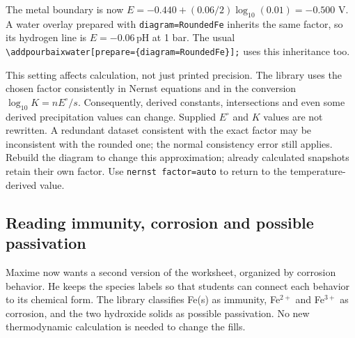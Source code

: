 \documentclass[a4paper,11pt]{ltxdoc}
\begin{document}
\begin{codeexample}[width=0pt]
\RoundedHandle
{}
\end{codeexample}

The metal boundary is now $E=-0.440+(0.06/2)\log_{10}(0.01)=-0.500$ V.
A water overlay prepared with \texttt{diagram=RoundedFe} inherits the same
factor, so its hydrogen line is $E=-0.06\,\mathrm{pH}$ at 1 bar. The usual
\verb|\addpourbaixwater[prepare={diagram=RoundedFe}];| uses this inheritance too.

This setting affects calculation, not just printed precision. The library uses
the chosen factor consistently in Nernst equations and in the conversion
$\log_{10}K=nE^\circ/s$. Consequently, derived constants, intersections and even
some derived precipitation values can change. Supplied $E^\circ$ and $K$ values
are not rewritten. A redundant dataset consistent with the exact factor may
be inconsistent with the rounded one; the normal consistency error still
applies. Rebuild the diagram to change this approximation; already calculated
snapshots retain their own factor. Use \texttt{nernst factor=auto} to return to
the temperature-derived value.

\subsection{Reading immunity, corrosion and possible passivation}
Maxime now wants a second version of the worksheet, organized by corrosion
behavior. He keeps the species labels so that students can connect each
behavior to its chemical form. The library classifies Fe(s) as immunity,
Fe$^{2+}$ and Fe$^{3+}$ as corrosion, and the two hydroxide solids as possible
passivation. No new thermodynamic calculation is needed to change the fills.
\end{document}
